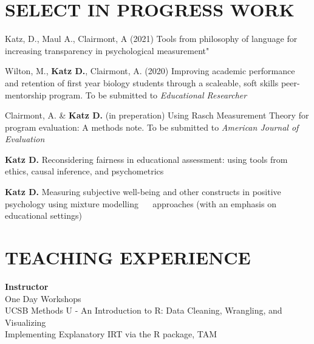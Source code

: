\documentclass[12pt, oneside,]{memoir}
\begin{document}
\hypertarget{select-in-progress-work}{%
\section{SELECT IN PROGRESS WORK}\label{select-in-progress-work}}
\begin{hangparas}{.25in}{1}
Katz, D., Maul A., Clairmont, A (2021) Tools from philosophy of language
for increasing transparency in psychological measurement"

Wilton, M., \textbf{Katz D.}, Clairmont, A. (2020) Improving academic performance and retention of first year biology students through a scaleable, soft skills peer-mentorship program. To be submitted to \emph{Educational Researcher}

\noindent Clairmont, A. \& \textbf{Katz D.} (in preperation) Using Rasch
Measurement Theory for program evaluation: A methods note. To be
submitted to \emph{American Journal of Evaluation}

\noindent \textbf{Katz D.} Reconsidering fairness in educational assessment: using
tools from ethics, causal inference, and psychometrics

\noindent \textbf{Katz D.} Measuring subjective well-being and other constructs in
positive psychology using mixture modelling ~~ approaches (with an
emphasis on educational settings)
\end{hangparas}
\vspace{4mm}

\hypertarget{teaching-experience}{%
\section{TEACHING EXPERIENCE}\label{teaching-experience}}

\noindent\textbf{Instructor}\\
\noindent One Day Workshops\\
\hspace*{0.333em}\hspace*{0.333em}UCSB Methods U - An Introduction to R: Data Cleaning, Wrangling, and Visualizing\\
\hspace*{0.333em}\hspace*{0.333em}Implementing Explanatory IRT via the R package, TAM
\vspace{4mm}
\end{document}

